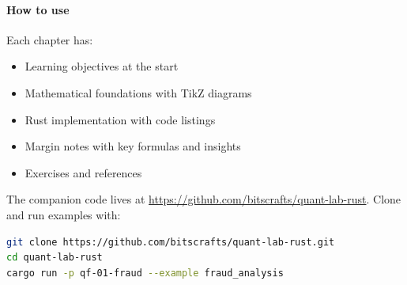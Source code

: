 \documentclass[
	fontsize=10pt,
	twoside=false,
	secnumdepth=2,
	open=any,
]{kaobook/kaobook}
\begin{document}
\paragraph{How to use}
Each chapter has:
\begin{itemize}
    \item Learning objectives at the start
    \item Mathematical foundations with TikZ diagrams
    \item Rust implementation with code listings
    \item Margin notes with key formulas and insights
    \item Exercises and references
\end{itemize}

The companion code lives at \url{https://github.com/bitscrafts/quant-lab-rust}.
Clone and run examples with:
\begin{lstlisting}[language=bash]
git clone https://github.com/bitscrafts/quant-lab-rust.git
cd quant-lab-rust
cargo run -p qf-01-fraud --example fraud_analysis
\end{lstlisting}


\begingroup

\setlength{\textheight}{230\vscale}
\etocstandarddisplaystyle
\etocstandardlines

\tableofcontents

\listoffigures

\let\cleardoublepage\bigskip
\let\clearpage\bigskip

\listoftables

\endgroup


\mainmatter
{}



\setcounter{chapter}{-1}

\end{document}

